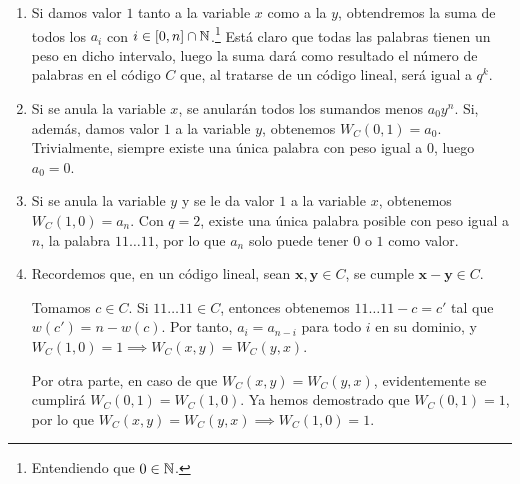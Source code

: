 \begin{enumerate}[label=\alph*)]
	\item Si damos valor $1$ tanto a la variable $x$ como a la $y$, obtendremos la suma de todos los $a_i$ con $i \in [0, n]\cap\mathbb{N}$.\footnote{Entendiendo que $0 \in \mathbb{N}$.} Está claro que todas las palabras tienen un peso en dicho intervalo, luego la suma dará como resultado el número de palabras en el código $C$ que, al tratarse de un código lineal, será igual a $q^k$.
	\item Si se anula la variable $x$, se anularán todos los sumandos menos $a_0y^n$. Si, además, damos valor $1$ a la variable $y$, obtenemos $W_C(0,1) = a_0$. Trivialmente, siempre existe una única palabra con peso igual a $0$, luego $a_0 = 0$.
	\item Si se anula la variable $y$ y se le da valor $1$ a la variable $x$, obtenemos $W_C(1,0) = a_n$. Con $q=2$, existe una única palabra posible con peso igual a $n$, la palabra $11\dots11$, por lo que $a_n$ solo puede tener $0$ o $1$ como valor.
	\item Recordemos que, en un código lineal, sean $\textbf{x}, \textbf{y} \in C$, se cumple $\textbf{x}-\textbf{y} \in C$.
	
	Tomamos $c \in C$. Si $11\dots11 \in C$, entonces obtenemos $11\dots11 - c = c'$ tal que $w(c') = n - w(c)$. Por tanto, $a_i = a_{n-i}$ para todo $i$ en su dominio, y $W_C(1,0) = 1 \implies W_C(x,y) = W_C(y,x)$.
	
	Por otra parte, en caso de que $W_C(x,y) = W_C(y,x)$, evidentemente se cumplirá $W_C(0,1) = W_C(1, 0)$. Ya hemos demostrado que $W_C(0,1) = 1$, por lo que $W_C(x,y) = W_C(y,x) \implies W_C(1,0) = 1$.
\end{enumerate}
